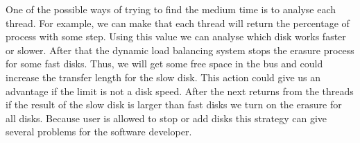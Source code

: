 One of the possible ways of trying to find the medium time is to analyse each thread. For example, we can make that each thread will return the percentage of process with some step. Using this value we can analyse which disk works faster or slower. After that the dynamic load balancing system stops the erasure process for some fast disks. Thus, we will get some free space in the bus and could increase the transfer length for the slow disk. This action could give us an advantage if the limit is not a disk speed. After the next returns from the threads if the result of the slow disk is larger than fast disks we turn on the erasure for all disks. Because user is allowed to stop or add disks this strategy can give several problems for the software developer.

